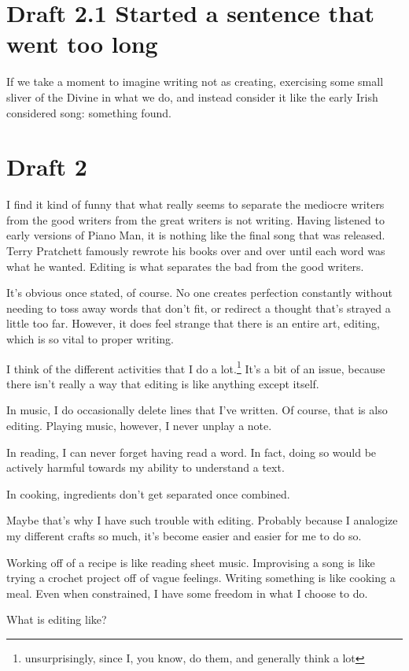 \documentclass[12pt]{article}[titlepage]
\newcommand{\1}{\={a}}
\newcommand{\2}{\={e}}
\newcommand{\3}{\={\i}}
\newcommand{\4}{\=o}
\newcommand{\5}{\=u}
\newcommand{\6}{\={A}}
\renewcommand{\,}{\textsuperscript{,}}
\begin{document}
\section{Draft 2.1 Started a sentence that went too long}
If we take a moment to imagine writing not as creating, exercising some small sliver of the Divine in what we do, and instead consider it like the early Irish considered song: something found.
\section{Draft 2}
I find it kind of funny that what really seems to separate the mediocre writers from the good writers from the great writers is not writing.
Having listened to early versions of Piano Man, it is nothing like the final song that was released.
Terry Pratchett famously rewrote his books over and over until each word was what he wanted.
Editing is what separates the bad from the good writers.

It's obvious once stated, of course.
No one creates perfection constantly without needing to toss away words that don't fit, or redirect a thought that's strayed a little too far.
However, it does feel strange that there is an entire art, editing, which is so vital to proper writing.

I think of the different activities that I do a lot.\footnote{unsurprisingly, since I, you know, do them, and generally think a lot}
It's a bit of an issue, because there isn't really a way that editing is like anything except itself.

In music, I do occasionally delete lines that I've written.
Of course, that is also editing.
Playing music, however, I never unplay a note.

In reading, I can never forget having read a word.
In fact, doing so would be actively harmful towards my ability to understand a text.

In cooking, ingredients don't get separated once combined.

Maybe that's why I have such trouble with editing.
Probably because I analogize my different crafts so much, it's become easier and easier for me to do so.

Working off of a recipe is like reading sheet music.
Improvising a song is like trying a crochet project off of vague feelings.
Writing something is like cooking a meal.
Even when constrained, I have some freedom in what I choose to do.

What is editing like?
\end{document}
